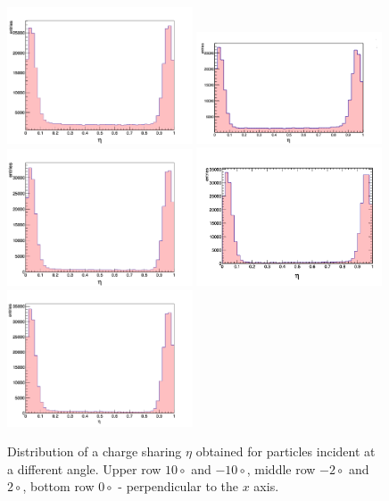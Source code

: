 \begin{figure}[tbph]
\begin{center}
\includegraphics[width = 0.49\textwidth]{figures/eta/eta_1d_10.png} 
\includegraphics[width = 0.49\textwidth]{figures/eta/eta_1d_neg10.png}
\includegraphics[width = 0.49\textwidth]{figures/eta/eta_1d_2.png} 
\includegraphics[width = 0.49\textwidth]{figures/eta/eta_1d_neg2.png} 
\includegraphics[width = 0.49\textwidth]{figures/eta/eta_1d_0.png} 

\caption{Distribution of a charge sharing $\eta$ obtained for particles incident at a different angle. Upper row $10\circ$ and $-10\circ$, middle row $-2 \circ$ and $2 \circ$, bottom row $0\circ$ - perpendicular to the $x$ axis.    }
\label{fig:eta_distribution}
 \end{center}
 \end{figure}
 
